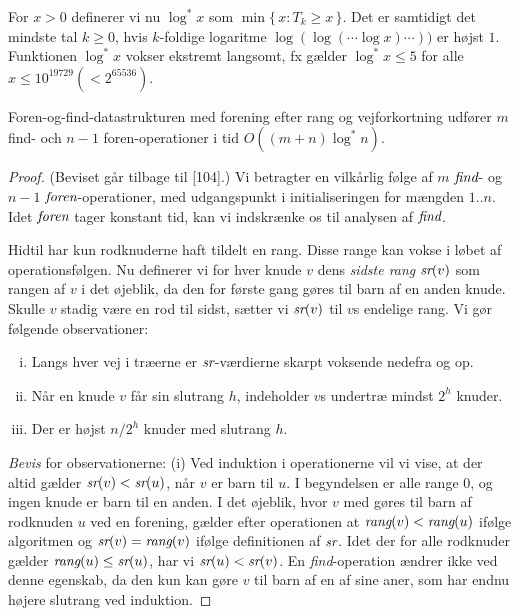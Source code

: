 For $x>0$ definerer vi nu $\log^* x$ som $\min\{\,x\colon T_k\geq x\,\}$.
Det er samtidigt det mindste tal $k\geq 0$, hvis $k$-foldige logaritme  $\log (\log (\cdots\log x)\cdots))$ er højst $1$.
Funktionen $\log ^* x$ vokser ekstremt langsomt, fx gælder $\log^*x\leq 5$ for alle $x\leq 10^{19729}(<2^{65536})$.

\begin{thm}
  Foren-og-find-datastrukturen med forening efter rang og vejforkortning udfører $m$ find- och $n-1$ foren-operationer i tid $O((m+n)\log^* n)$.
\end{thm}

\begin{proof}
  (Beviset går tilbage til [104].)
  Vi betragter en vilkårlig følge af $m$ $\operatorname{\emph{find}}$- og $n-1$ $\operatorname{\emph{foren}}$-operationer, med udgangspunkt i initialiseringen for mængden $1..n$.
  Idet $\operatorname{\emph{foren}}$ tager konstant tid, kan vi indskrænke os til analysen af $\operatorname{\emph{find}}$.

  Hidtil har kun rodknuderne haft tildelt en rang.
  Disse range kan vokse i løbet af operationsfølgen.
  Nu  definerer vi for hver knude $v$ dens \emph{sidste rang} $\operatorname{\emph{sr}}(v)$ som rangen af $v$ i det øjeblik, da den for første gang gøres til barn af en anden knude.
  Skulle $v$ stadig være en rod til sidst, sætter vi $\emph{sr}(v)$ til $v$s endelige rang.
  Vi gør følgende observationer:
  \begin{enumerate}[(i)]
    \item Langs hver vej i træerne er $\operatorname{\emph{sr}}$-værdierne skarpt voksende nedefra og op.
    \item Når en knude $v$ får sin slutrang $h$, indeholder $v$s undertræ mindst $2^h$ knuder.
    \item Der er højst $n/2^h$ knuder med slutrang $h$.
  \end{enumerate}
  \emph{Bevis} for observationerne:
  (i) Ved induktion i operationerne vil vi vise, at der altid gælder $\operatorname{\emph{sr}}(v)<\operatorname{\emph{sr}}(u)$, når $v$ er barn til $u$.
  I begyndelsen er alle range $0$, og ingen knude er barn til en anden.
  I det øjeblik, hvor $v$ med gøres til barn af rodknuden $u$ ved en forening, gælder efter operationen at $\operatorname{\emph{rang}}(v)<\operatorname{\emph{rang}}(u)$ ifølge algoritmen og $\operatorname{\emph{sr}}(v)=\operatorname{\emph{rang}}(v)$ ifølge definitionen af $\operatorname{\emph{sr}}$.
  Idet der for alle rodknuder gælder $\operatorname{\emph{rang}}(u)\leq \operatorname{\emph{sr}}(u)$, har vi $\operatorname{\emph{sr}}(u)<\operatorname{\emph{sr}}(v)$.
  En \emph{find}-operation ændrer ikke ved denne egenskab, da den kun kan gøre $v$ til barn af en af sine aner, som har endnu højere slutrang ved induktion.


\end{proof}
